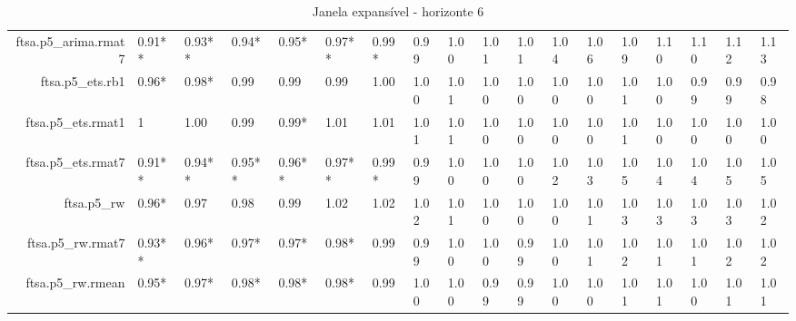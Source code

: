 \begin{table}[ht]
{\begin{tabular}{rlllllllllllllllll}
  ftsa.p5\_arima.rmat7 & 0.91** & 0.93** & 0.94* & 0.95* & 0.97** & 0.99* & 0.99 & 1.00 & 1.01 & 1.01 & 1.04 & 1.06 & 1.09 & 1.10 & 1.10 & 1.12 & 1.13 \\ 
  ftsa.p5\_ets.rb1 & 0.96* & 0.98* & 0.99 & 0.99 & 0.99 & 1.00 & 1.00 & 1.01 & 1.00 & 1.00 & 1.00 & 1.00 & 1.01 & 1.00 & 0.99 & 0.99 & 0.98 \\ 
  ftsa.p5\_ets.rmat1 & 1 & 1.00 & 0.99 & 0.99* & 1.01 & 1.01 & 1.01 & 1.01 & 1.00 & 1.00 & 1.00 & 1.00 & 1.01 & 1.00 & 1.00 & 1.00 & 1.00 \\ 
  ftsa.p5\_ets.rmat7 & 0.91** & 0.94** & 0.95** & 0.96** & 0.97** & 0.99* & 0.99 & 1.00 & 1.00 & 1.00 & 1.02 & 1.03 & 1.05 & 1.04 & 1.04 & 1.05 & 1.05 \\ 
  ftsa.p5\_rw & 0.96* & 0.97 & 0.98 & 0.99 & 1.02 & 1.02 & 1.02 & 1.01 & 1.00 & 1.00 & 1.00 & 1.01 & 1.03 & 1.03 & 1.03 & 1.03 & 1.02 \\ 
  ftsa.p5\_rw.rmat7 & 0.93** & 0.96* & 0.97* & 0.97* & 0.98* & 0.99 & 0.99 & 1.00 & 1.00 & 0.99 & 1.00 & 1.01 & 1.02 & 1.01 & 1.01 & 1.02 & 1.02 \\ 
  ftsa.p5\_rw.rmean & 0.95* & 0.97* & 0.98* & 0.98* & 0.98* & 0.99 & 1.00 & 1.00 & 0.99 & 0.99 & 1.00 & 1.00 & 1.01 & 1.01 & 1.00 & 1.01 & 1.01 \\ 
   \hline
\end{tabular}
}
\caption{Janela expansível - horizonte 6} 
\end{table}
